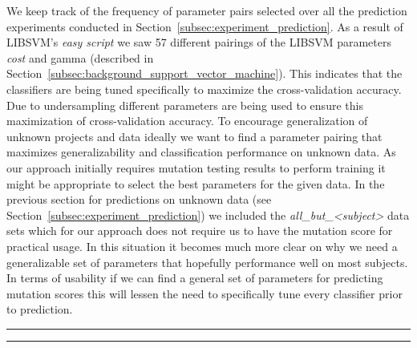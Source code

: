 \noindent
We keep track of the frequency of parameter pairs selected over all the prediction experiments conducted in Section~\ref{subsec:experiment_prediction}. As a result of LIBSVM's \emph{easy script} we saw 57 different pairings of the LIBSVM parameters \emph{cost} and {gamma} (described in Section~\ref{subsec:background_support_vector_machine}). This indicates that the classifiers are being tuned specifically to maximize the cross-validation accuracy. Due to undersampling different parameters are being used to ensure this maximization of cross-validation accuracy. To encourage generalization of unknown projects and data ideally we want to find a parameter pairing that maximizes generalizability and classification performance on unknown data. As our approach initially requires mutation testing results to perform training it might be appropriate to select the best parameters for the given data. In the previous section for predictions on unknown data (see Section~\ref{subsec:experiment_prediction}) we included the \emph{all\_but\_<subject>} data sets which for our approach does not require us to have the mutation score for practical usage. In this situation it becomes much more clear on why we need a generalizable set of parameters that hopefully performance well on most subjects. In terms of usability if we can find a general set of parameters for predicting mutation scores this will lessen the need to specifically tune every classifier prior to prediction.

\begin{sidewaysfigure}[h]
  \centering

  \vspace{2mm}
  \hrule
	\vspace{3em}    

  \centering
  \vspace{2mm}
  \hrule  
\end{sidewaysfigure}

